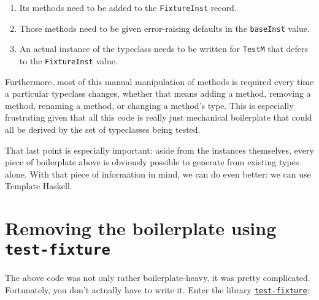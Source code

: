 \begin{enumerate}

\item
  Its methods need to be added to the \texttt{FixtureInst} record.
\item
  Those methods need to be given error-raising defaults in the
  \texttt{baseInst} value.
\item
  An actual instance of the typeclass needs to be written for
  \texttt{TestM} that defers to the \texttt{FixtureInst} value.
\end{enumerate}
Furthermore, most of this manual manipulation of methods is required
every time a particular typeclass changes, whether that means adding a
method, removing a method, renaming a method, or changing a method's
type. This is especially frustrating given that all this code is really
just mechanical boilerplate that could all be derived by the set of
typeclasses being tested.

That last point is especially important: aside from the instances
themselves, every piece of boilerplate above is obviously possible to
generate from existing types alone. With that piece of information in
mind, we can do even better: we can use Template Haskell.

\hypertarget{removing-the-boilerplate-using-test-fixture}{%
\section{\texorpdfstring{Removing the boilerplate using
\texttt{test-fixture}}{Removing the boilerplate using test-fixture}}\label{removing-the-boilerplate-using-test-fixture}}

The above code was not only rather boilerplate-heavy, it was pretty
complicated. Fortunately, you don't actually have to write it. Enter the
library
\href{http://hackage.haskell.org/package/test-fixture}{\texttt{test-fixture}}:

